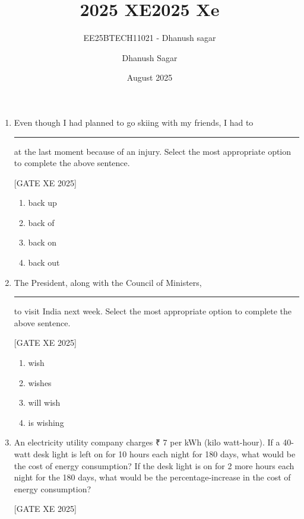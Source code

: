 \documentclass[journal,12pt,onecolumn]{IEEEtran}
\theoremstyle{remark}
\begin{document}
\title{2025 XE}
\author{EE25BTECH11021 - Dhanush sagar}
\maketitle
\renewcommand{\thefigure}{\theenumi}
\renewcommand{\thetable}{\theenumi}
\title{2025 Xe}
\author{Dhanush Sagar}
\date{August 2025}

\begin{enumerate}


\item Even though I had planned to go skiing with my friends, I had to \rule{3cm}{0.15mm} at the last moment because of an injury.  
Select the most appropriate option to complete the above sentence.

\hfill [GATE XE 2025]

\begin{multicols}{2}
\begin{enumerate}
\item back up
\item back of
\item back on
\item back out
\end{enumerate}
\end{multicols}

\item The President, along with the Council of Ministers, \rule{3cm}{0.15mm} to visit India next week.  
Select the most appropriate option to complete the above sentence.

\hfill [GATE XE 2025]

\begin{multicols}{2}
\begin{enumerate}
\item wish
\item wishes
\item will wish
\item is wishing
\end{enumerate}
\end{multicols}

\item An electricity utility company charges ₹ 7 per kWh (kilo watt-hour). If a 40-watt desk light is left on for 10 hours each night for 180 days, what would be the cost of energy consumption? If the desk light is on for 2 more hours each night for the 180 days, what would be the percentage-increase in the cost of energy consumption?

\hfill [GATE XE 2025]


\end{enumerate}
\end{document}
